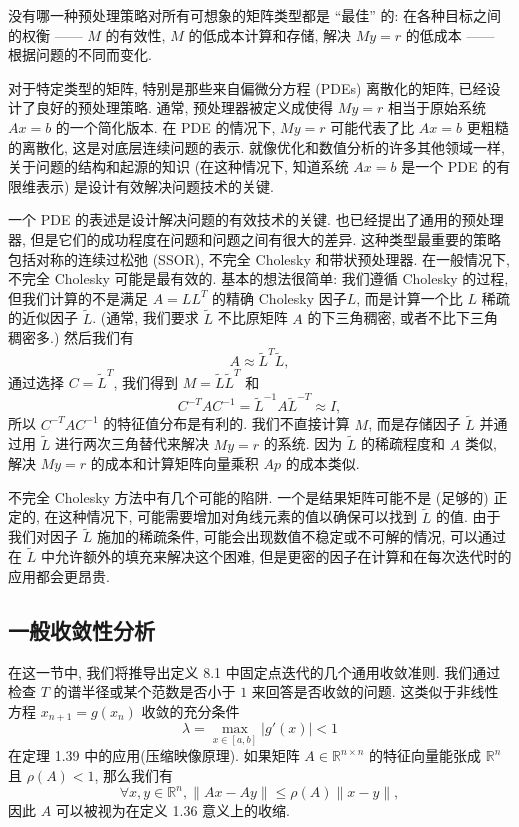 \documentclass[a4paper]{ctexart}
\begin{document}
{没有哪一种预处理策略对所有可想象的矩阵类型都是 ``最佳'' 的: 在各种目标之间的权衡 —— $M$ 的有效性, 
$M$ 的低成本计算和存储, 解决 $My = r$ 的低成本 —— 根据问题的不同而变化.

对于特定类型的矩阵, 特别是那些来自偏微分方程 (PDEs) 离散化的矩阵, 
已经设计了良好的预处理策略. 通常, 预处理器被定义成使得 $My = r$ 相当于原始系统 $Ax = b$ 的一个简化版本. 
在 PDE 的情况下, $My = r$ 可能代表了比 $Ax = b$ 更粗糙的离散化, 这是对底层连续问题的表示. 
就像优化和数值分析的许多其他领域一样, 关于问题的结构和起源的知识 (在这种情况下, 知道系统 $Ax = b$ 是一个 PDE 的有限维表示) 
是设计有效解决问题技术的关键.

一个 PDE 的表述是设计解决问题的有效技术的关键. 也已经提出了通用的预处理器, 
但是它们的成功程度在问题和问题之间有很大的差异. 这种类型最重要的策略包括对称的连续过松弛 (SSOR), 
不完全 Cholesky 和带状预处理器. 在一般情况下, 不完全 Cholesky 可能是最有效的. 
基本的想法很简单: 我们遵循 Cholesky 的过程, 但我们计算的不是满足 $A = L L^T$ 的精确 Cholesky 因子$L$, 
而是计算一个比 $L$ 稀疏的近似因子 $\tilde{L}$. 
(通常, 我们要求 $\tilde{L}$ 不比原矩阵 $A$ 的下三角稠密, 或者不比下三角稠密多.)
然后我们有 
$$
A \approx \tilde{L}^T \tilde{L},
$$
通过选择 $C = \tilde{L}^T$, 我们得到 $M = \tilde{L} \tilde{L}^T$ 和
$$
C^{-T}AC^{-1} = \tilde{L}^{-1} A \tilde{L}^{-T} \approx I,
$$
所以 $C^{-T} A C^{-1}$ 的特征值分布是有利的. 我们不直接计算 $M$, 
而是存储因子 $\tilde{L}$ 并通过用 $\tilde{L}$ 进行两次三角替代来解决 $My=r$ 的系统. 
因为 $\tilde{L}$ 的稀疏程度和 $A$ 类似, 解决 $My=r$ 的成本和计算矩阵向量乘积 $Ap$ 的成本类似.

不完全 Cholesky 方法中有几个可能的陷阱. 一个是结果矩阵可能不是 (足够的) 正定的, 
在这种情况下, 可能需要增加对角线元素的值以确保可以找到 $\tilde{L}$ 的值. 
由于我们对因子 $\tilde{L}$ 施加的稀疏条件, 可能会出现数值不稳定或不可解的情况, 
可以通过在 $\tilde{L}$ 中允许额外的填充来解决这个困难, 但是更密的因子在计算和在每次迭代时的应用都会更昂贵.

\subsection{一般收敛性分析}

在这一节中, 我们将推导出定义 8.1 中固定点迭代的几个通用收敛准则. 
我们通过检查 $T$ 的谱半径或某个范数是否小于 $1$ 来回答是否收敛的问题.
这类似于非线性方程 $x_{n + 1} = g(x_n)$ 收敛的充分条件 
$$
\lambda = \max_{x \in [a,b]} |g'(x)| < 1
$$
在定理 1.39 中的应用(压缩映像原理). 如果矩阵 $A \in \mathbb{R}^{n \times n}$ 
的特征向量能张成 $\mathbb{R}^n$ 且 $\rho(A) < 1$, 
那么我们有 
$$
\forall x, y \in \mathbb{R}^n, \|Ax - Ay\| \leq \rho(A)\|x - y\|,
$$
因此 $A$ 可以被视为在定义 1.36 意义上的收缩.

}
\end{document}
